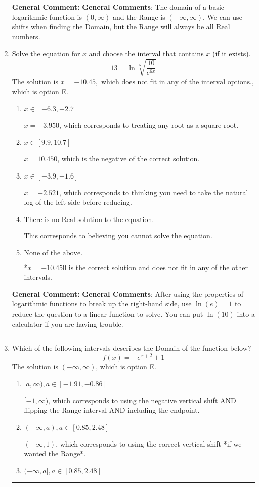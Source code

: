 \documentclass{extbook}[14pt]
\newcommand{\litem}[1]{\item #1

\rule{\textwidth}{0.4pt}}
\begin{document}
\begin{enumerate}
{\textbf{General Comment:} \textbf{General Comments}: The domain of a basic logarithmic function is $(0, \infty)$ and the Range is $(-\infty, \infty)$. We can use shifts when finding the Domain, but the Range will always be all Real numbers.
}
\litem{
 Solve the equation for $x$ and choose the interval that contains $x$ (if it exists).
\[  13 = \ln{\sqrt[5]{\frac{10}{e^{6x}}}} \]
The solution is \( x = -10.45, \text{ which does not fit in any of the interval options.} \), which is option E.\begin{enumerate}[label=\Alph*.]
\item \( x \in [-6.3, -2.7] \)

$x = -3.950$, which corresponds to treating any root as a square root.
\item \( x \in [9.9, 10.7] \)

$x = 10.450$, which is the negative of the correct solution.
\item \( x \in [-3.9, -1.6] \)

$x = -2.521$, which corresponds to thinking you need to take the natural log of the left side before reducing.
\item \( \text{There is no Real solution to the equation.} \)

This corresponds to believing you cannot solve the equation.
\item \( \text{None of the above.} \)

*$x = -10.450$ is the correct solution and does not fit in any of the other intervals.
\end{enumerate}

\textbf{General Comment:} \textbf{General Comments}: After using the properties of logarithmic functions to break up the right-hand side, use $\ln(e) = 1$ to reduce the question to a linear function to solve. You can put $\ln(10)$ into a calculator if you are having trouble.
}
\litem{
Which of the following intervals describes the Domain of the function below?
\[ f(x) = -e^{x+2}+1 \]
The solution is \( (-\infty, \infty) \), which is option E.\begin{enumerate}[label=\Alph*.]
\item \( [a, \infty), a \in [-1.91, -0.86] \)

$[-1, \infty)$, which corresponds to using the negative vertical shift AND flipping the Range interval AND including the endpoint.
\item \( (-\infty, a), a \in [0.85, 2.48] \)

$(-\infty, 1)$, which corresponds to using the correct vertical shift *if we wanted the Range*.
\item \( (-\infty, a], a \in [0.85, 2.48] \)


\end{enumerate}}
\end{enumerate}
\end{document}
